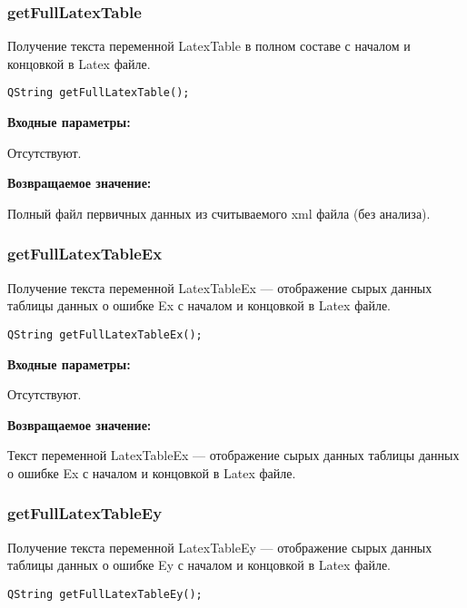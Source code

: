 \documentclass[a4paper,12pt]{article}
\begin{document}
\subsubsection{getFullLatexTable}\label{getFullLatexTable}

Получение текста переменной LatexTable в полном составе с началом и концовкой в Latex файле.


\begin{lstlisting}[label=code_syntax_getFullLatexTable,caption=Синтаксис]
QString getFullLatexTable();
\end{lstlisting}

\textbf{Входные параметры:}

Отсутствуют.

\textbf{Возвращаемое значение:}

Полный файл первичных данных из считываемого xml файла (без анализа).


\subsubsection{getFullLatexTableEx}\label{getFullLatexTableEx}

Получение текста переменной LatexTableEx --- отображение сырых данных таблицы данных о ошибке Ex с началом и концовкой в Latex файле.


\begin{lstlisting}[label=code_syntax_getFullLatexTableEx,caption=Синтаксис]
QString getFullLatexTableEx();
\end{lstlisting}

\textbf{Входные параметры:}

Отсутствуют.

\textbf{Возвращаемое значение:}

Текст переменной LatexTableEx --- отображение сырых данных таблицы данных о ошибке Ex с началом и концовкой в Latex файле.


\subsubsection{getFullLatexTableEy}\label{getFullLatexTableEy}

Получение текста переменной LatexTableEy --- отображение сырых данных таблицы данных о ошибке Ey с началом и концовкой в Latex файле.


\begin{lstlisting}[label=code_syntax_getFullLatexTableEy,caption=Синтаксис]
QString getFullLatexTableEy();
\end{lstlisting}
\end{document}
